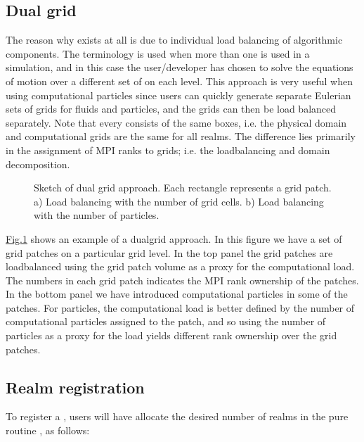 \documentclass[letterpaper,10pt,english]{sphinxmanual}
\let\sphinxpxdimen\pdfpxdimen\else\newdimen\sphinxpxdimen
\begin{document}
\subsection{Dual grid}
\label{\detokenize{Source/Realm:dual-grid}}
The reason why  exists at all is due to individual load balancing of algorithmic components.
The terminology  is used when more than one  is used in a simulation, and in this case the user/developer has chosen to solve the equations of motion over a different set of  on each level.
This approach is very useful when using computational particles since users can quickly generate separate Eulerian sets of grids for fluids and particles, and the grids can then be load balanced separately.
Note that every  consists of the same boxes, i.e. the physical domain and computational grids are the same for all realms.
The difference lies primarily in the assignment of MPI ranks to grids; i.e. the load\sphinxhyphen{}balancing and domain decomposition.

\begin{figure}[htb]
\centering
\capstart

\noindent\sphinxincludegraphics[width=360\sphinxpxdimen]{{DualMesh}.png}
\caption{Sketch of dual grid approach.
Each rectangle represents a grid patch. a) Load balancing with the number of grid cells. b) Load balancing with the number of particles.}\label{\detokenize{Source/Realm:id1}}\label{\detokenize{Source/Realm:fig-dualmesh}}\end{figure}

\hyperref[\detokenize{Source/Realm:fig-dualmesh}]{Fig.\@ \ref{\detokenize{Source/Realm:fig-dualmesh}}} shows an example of a dual\sphinxhyphen{}grid approach.
In  this figure we have a set of grid patches on a particular grid level.
In the top panel the grid patches are load\sphinxhyphen{}balanced using the grid patch volume as a proxy for the computational load.
The numbers in each grid patch indicates the MPI rank ownership of the patches.
In the bottom panel we have introduced computational particles in some of the patches.
For particles, the computational load is better defined by the number of computational particles assigned to the patch, and so using the number of particles as a proxy for the load yields different rank ownership over the grid patches.


\subsection{Realm registration}
\label{\detokenize{Source/Realm:realm-registration}}
To register a , users will have  allocate the desired number of realms in the pure routine , as follows:
\end{document}
